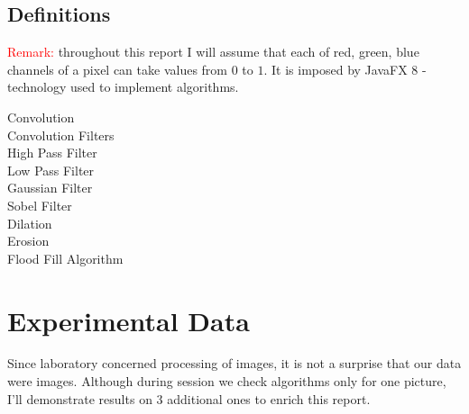 \documentclass{article}
\begin{document}
\subsection{Definitions}
\label{definitions}
\textcolor{red}{Remark:} throughout this report I will assume that each of red, green, blue channels of a pixel can take values from $0$ to $1$. It is imposed by JavaFX 8 - technology used to implement algorithms.

\begin{description}
\item[Convolution]
\item[Convolution Filters]
\item[High Pass Filter]
\item[Low Pass Filter]
\item[Gaussian Filter]
\item[Sobel Filter]
\item[Dilation]
\item[Erosion]
\item[Flood Fill Algorithm]
\end{description} 

 

\section{Experimental Data}
Since laboratory concerned processing of images, it is not a surprise that our data were images. Although during session we check algorithms only for one picture, I'll demonstrate results on 3 additional ones to enrich this report. 
\end{document}
